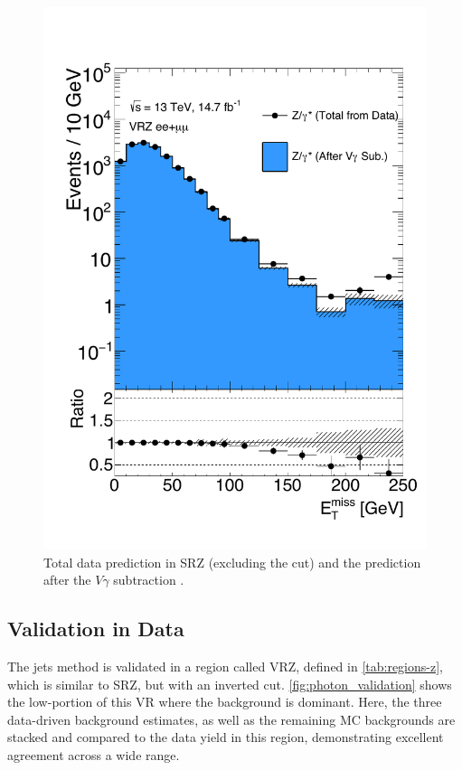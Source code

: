 \begin{centering}
\begin{figure}[!hbt]
\myfloatalign
\includegraphics[width=.90\linewidth]{figures/photons/Vgamma_MET_ee+mm_zmet_onz.pdf}
\caption{Total \gjets data prediction in SRZ (excluding the \met cut) and the prediction after the $V\gamma$ subtraction \cite{this_paper}.}
\label{fig:photon_vgamma_subt}
\end{figure}
\end{centering}

\subsection{Validation in Data}

The \gjets jets method is validated in a region called VRZ, defined in \autoref{tab:regions-z}, which is similar to SRZ, but with an inverted \met cut. \autoref{fig:photon_validation} shows the low-\met portion of this \ac{VR} where the \dyjets background is dominant. Here, the three data-driven background estimates, as well as the remaining \ac{MC} backgrounds are stacked and compared to the data yield in this region, demonstrating excellent agreement across a wide \met range. 

